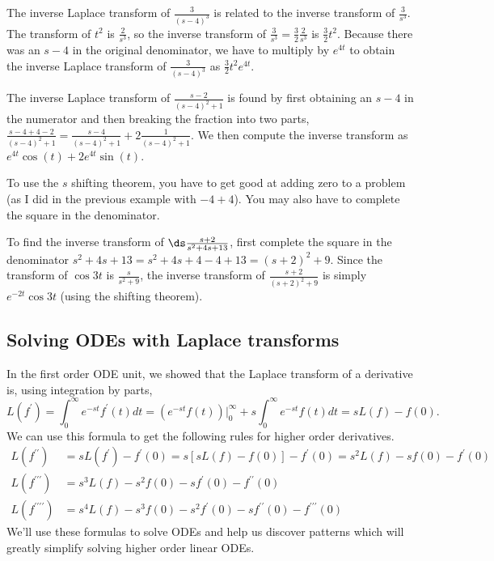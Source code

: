 \begin{example}
The inverse Laplace transform of $\frac{3}{(s-4)^3}$ is related to the inverse transform of $\frac{3}{s^3}$. The transform of $t^2$ is $\frac{2}{s^3}$, so the inverse transform of $\frac{3}{s^3}=\frac{3}{2}\frac{2}{s^3}$ is $\frac{3}{2}t^2$.  Because there was an $s-4$ in the original denominator, we have to multiply by $e^{4t}$ to obtain the inverse Laplace transform of $\frac{3}{(s-4)^3}$ as $\frac{3}{2}t^2e^{4t}$.  
\end{example}

\begin{example}
The inverse Laplace transform of $\frac{s-2}{(s-4)^2+1}$ is found by first obtaining an $s-4$ in the numerator and then breaking the fraction into two parts, $\frac{s-4+4-2}{(s-4)^2+1} = \frac{s-4}{(s-4)^2+1}+2\frac{1}{(s-4)^2+1}$. We then compute the inverse transform as $e^{4t}\cos(t) + 2e^{4t}\sin(t)$.  
\end{example}

To use the $s$ shifting theorem, you have to get good at adding zero to a problem (as I did in the previous example with $-4+4$). You may also have to complete the square in the denominator. 



\begin{example}
To find the inverse transform of $\ds \frac{s+2}{s^2+4s+13}$, first complete the square in the denominator $s^2+4s+13 = s^2+4s+4-4+13 = (s+2)^2+9$. Since the transform of $\cos 3t$ is $\frac{s}{s^2+9}$, the inverse transform of $\frac{s+2}{(s+2)^2+9}$ is simply $e^{-2t}\cos 3t$ (using the shifting theorem). 

\end{example}


\subsection{Solving ODEs with Laplace transforms}
In the first order ODE unit, we showed that the Laplace transform of a derivative is, using integration by parts, $$L(f^\prime)=\int_0^\infty e^{-st}f^\prime (t)dt = (e^{-st}f(t))\big|_0^\infty + s\int_0^\infty e^{-st}f (t)dt  = sL(f)-f(0).$$  We can use this formula to get the following rules for higher order derivatives. 
\begin{align*}
L(f^{\prime\prime}) &= sL(f^\prime)-f^\prime(0) = s[sL(f)-f(0)]-f^\prime(0) = s^2L(f) - sf(0)-f^\prime(0)\\
L(f^{\prime\prime\prime}) &= s^3L(f) - s^2f(0)-sf^\prime(0)-f^{\prime\prime}(0)\\
L(f^{\prime\prime\prime\prime}) &= s^4L(f) - s^3f(0)-s^2f^\prime(0)-sf^{\prime\prime}(0)-f^{\prime\prime\prime}(0)
\end{align*} 
We'll use these formulas to solve ODEs and help us discover patterns which will greatly simplify solving higher order linear ODEs. 

